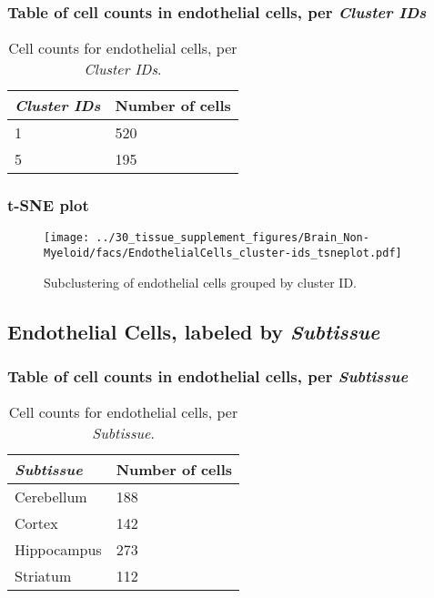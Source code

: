 \subsubsection{Table of cell counts in endothelial cells, per \emph{Cluster IDs}}\begin{table}[h]
\centering
\label{my-label}
\begin{tabular}{@{}ll@{}}
\toprule

\emph{Cluster IDs}& Number of cells \\ \midrule
1 & 520 \\

5 & 195 \\
\bottomrule
\end{tabular}
\caption{Cell counts for endothelial cells, per \emph{Cluster IDs}.}
\end{table}

\clearpage
\subsubsection{t-SNE plot}
\begin{figure}[h]
\centering
\texttt{[image: ../30\_tissue\_supplement\_figures/Brain\_Non-Myeloid/facs/EndothelialCells\_cluster-ids\_tsneplot.pdf]}

\caption{Subclustering of endothelial cells grouped by cluster ID.
}
\end{figure}


\clearpage

\subsection{Endothelial Cells, labeled by \emph{Subtissue}}
\subsubsection{Table of cell counts in endothelial cells, per \emph{Subtissue}}\begin{table}[h]
\centering
\label{my-label}
\begin{tabular}{@{}ll@{}}
\toprule

\emph{Subtissue}& Number of cells \\ \midrule
Cerebellum & 188 \\

Cortex & 142 \\

Hippocampus & 273 \\

Striatum & 112 \\
\bottomrule
\end{tabular}
\caption{Cell counts for endothelial cells, per \emph{Subtissue}.}
\end{table}

